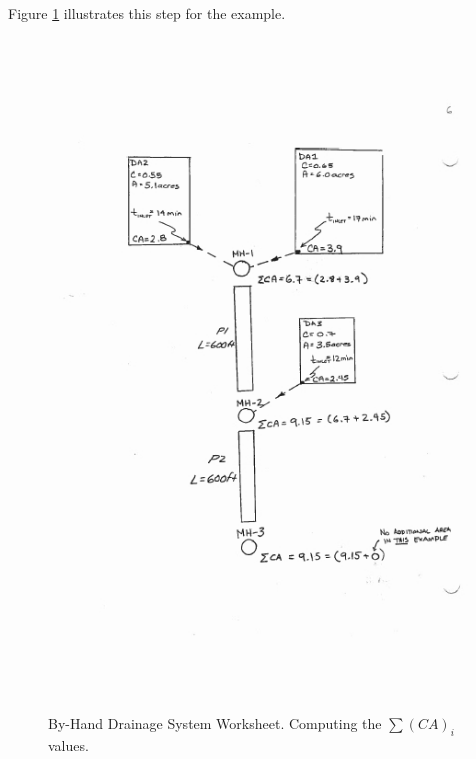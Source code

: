 \documentclass[12pt]{article}
\begin{document}
\begin{enumerate}
Figure \ref{fig:DrainageLayout6} illustrates this step for the example.
\begin{figure}[ht!] %
\centering
   \includegraphics[height=7in]{DrainageLayout6.jpg}
   \caption{By-Hand Drainage System Worksheet. Computing the $\sum (CA)_i$ values.}
   \label{fig:DrainageLayout6} 
\end{figure}
\end{enumerate}
\end{document}
